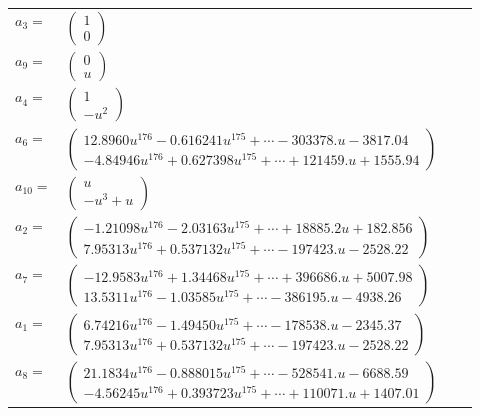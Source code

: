 \documentclass[1p]{elsarticle_modified}
\theoremstyle{definition}
\begin{document}
\begin{tabular}{m{7pt} m{180pt} m{7pt} m{180pt} }
\flushright $a_{3}=$&$\begin{pmatrix}1\\0\end{pmatrix}$ \\
\flushright $a_{9}=$&$\begin{pmatrix}0\\u\end{pmatrix}$ \\
\flushright $a_{4}=$&$\begin{pmatrix}1\\- u^2\end{pmatrix}$ \\
\flushright $a_{6}=$&$\begin{pmatrix}12.8960 u^{176}-0.616241 u^{175}+\cdots-303378. u-3817.04\\-4.84946 u^{176}+0.627398 u^{175}+\cdots+121459. u+1555.94\end{pmatrix}$ \\
\flushright $a_{10}=$&$\begin{pmatrix}u\\- u^3+u\end{pmatrix}$ \\
\flushright $a_{2}=$&$\begin{pmatrix}-1.21098 u^{176}-2.03163 u^{175}+\cdots+18885.2 u+182.856\\7.95313 u^{176}+0.537132 u^{175}+\cdots-197423. u-2528.22\end{pmatrix}$ \\
\flushright $a_{7}=$&$\begin{pmatrix}-12.9583 u^{176}+1.34468 u^{175}+\cdots+396686. u+5007.98\\13.5311 u^{176}-1.03585 u^{175}+\cdots-386195. u-4938.26\end{pmatrix}$ \\
\flushright $a_{1}=$&$\begin{pmatrix}6.74216 u^{176}-1.49450 u^{175}+\cdots-178538. u-2345.37\\7.95313 u^{176}+0.537132 u^{175}+\cdots-197423. u-2528.22\end{pmatrix}$ \\
\flushright $a_{8}=$&$\begin{pmatrix}21.1834 u^{176}-0.888015 u^{175}+\cdots-528541. u-6688.59\\-4.56245 u^{176}+0.393723 u^{175}+\cdots+110071. u+1407.01\end{pmatrix}$ \\

\end{tabular}
\end{document}
